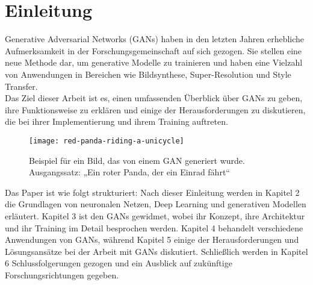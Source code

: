 \chapter{Einleitung}

\noindent Generative Adversarial Networks (GANs) haben in den letzten Jahren erhebliche Aufmerksamkeit in der Forschungsgemeinschaft auf sich gezogen. Sie stellen eine neue Methode dar, um generative Modelle zu trainieren und haben eine Vielzahl von Anwendungen in Bereichen wie Bildsynthese, Super-Resolution und Style Transfer. \\

\noindent Das Ziel dieser Arbeit ist es, einen umfassenden Überblick über GANs zu geben, ihre Funktionsweise zu erklären und einige der Herausforderungen zu diskutieren, die bei ihrer Implementierung und ihrem Training auftreten. \\

\begin{wrapfigure}{l}{0.50\textwidth}
    \centering
    \texttt{[image: red-panda-riding-a-unicycle]}
    \caption{Beispiel für ein Bild, das von einem GAN generiert wurde. Ausgangssatz: „Ein roter Panda, der ein Einrad fährt“}
    \label{Abb:basic}
    \end{wrapfigure}

\hfill
\break
Das Paper ist wie folgt strukturiert: Nach dieser Einleitung werden in Kapitel 2 die Grundlagen von neuronalen Netzen, Deep Learning und generativen Modellen erläutert. Kapitel 3 ist den GANs gewidmet, wobei ihr Konzept, ihre Architektur und ihr Training im Detail besprochen werden. Kapitel 4 behandelt verschiedene Anwendungen von GANs, während Kapitel 5 einige der Herausforderungen und Lösungsansätze bei der Arbeit mit GANs diskutiert. Schließlich werden in Kapitel 6 Schlussfolgerungen gezogen und ein Ausblick auf zukünftige Forschungsrichtungen gegeben. \\